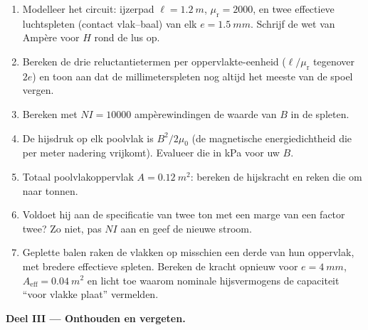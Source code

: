 \begin{problem}
\begin{enumerate}[resume]
  \item Modelleer het circuit: ijzerpad $\ell = \qty{1.2}{m}$,
        $\mu_{\text{r}} = 2000$, en twee effectieve luchtspleten
        (contact vlak--baal) van elk $e = \qty{1.5}{mm}$. Schrijf
        de wet van Ampère voor $H$ rond de lus op.
  \item Bereken de drie reluctantietermen per oppervlakte-eenheid
        ($\ell/\mu_{\text{r}}$ tegenover $2e$) en toon aan dat de
        millimeterspleten nog altijd het meeste van de spoel vergen.
  \item Bereken met $NI = \num{10000}$ ampèrewindingen de waarde van $B$ in
        de spleten.
  \item De hijsdruk op elk poolvlak is $B^2/2\mu_0$
        (de magnetische energiedichtheid die per meter nadering vrijkomt).
        Evalueer die in \unit{kPa} voor uw $B$.
  \item Totaal poolvlakoppervlak $A = \qty{0.12}{m^2}$: bereken de
        hijskracht en reken die om naar tonnen.
  \item Voldoet hij aan de specificatie van twee ton met een marge van
        een factor twee? Zo niet, pas $NI$ aan en geef de nieuwe stroom.
  \item Geplette balen raken de vlakken op misschien een derde van hun
        oppervlak, met bredere effectieve spleten. Bereken de kracht opnieuw voor
        $e = \qty{4}{mm}$, $A_{\text{eff}} = \qty{0.04}{m^2}$ en
        licht toe waarom nominale hijsvermogens de capaciteit ``voor vlakke plaat'' vermelden.
\end{enumerate}

\medskip\noindent\textbf{Deel III --- Onthouden en vergeten.}


\end{problem}
